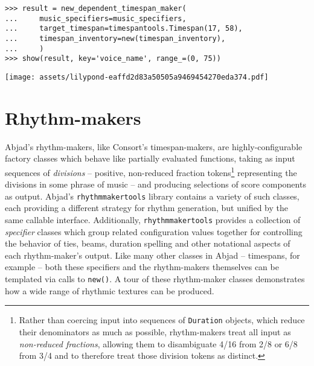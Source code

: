 \begin{comment}
<abjad>
result = new_dependent_timespan_maker(
    music_specifiers=music_specifiers,
    target_timespan=timespantools.Timespan(17, 58),
    timespan_inventory=new(timespan_inventory),
    )
show(result, key='voice_name', range_=(0, 75))
</abjad>
\end{comment}

\begin{abjadbookoutput}
\begin{singlespacing}
\vspace{-0.5\baselineskip}
\begin{lstlisting}
>>> result = new_dependent_timespan_maker(
...     music_specifiers=music_specifiers,
...     target_timespan=timespantools.Timespan(17, 58),
...     timespan_inventory=new(timespan_inventory),
...     )
>>> show(result, key='voice_name', range_=(0, 75))
\end{lstlisting}
\noindent\texttt{[image: assets/lilypond-eaffd2d83a50505a9469454270eda374.pdf]}
\end{singlespacing}
\end{abjadbookoutput}

\section{Rhythm-makers}
\label{sec:rhythm-makers}

Abjad's rhythm-makers, like Consort's timespan-makers, are highly-configurable
factory classes which behave like partially evaluated functions, taking as
input sequences of \emph{divisions} -- positive, non-reduced fraction
tokens\footnote{Rather than coercing input into sequences of \texttt{Duration}
objects, which reduce their denominators as much as possible, rhythm-makers
treat all input as \emph{non-reduced fractions}, allowing them to disambiguate
4/16 from 2/8 or 6/8 from 3/4 and to therefore treat those division tokens as
distinct.} representing the divisions in some phrase of music -- and producing
selections of score components as output. Abjad's \texttt{rhythmmakertools}
library contains a variety of such classes, each providing a different strategy
for rhythm generation, but unified by the same callable interface.
Additionally, \texttt{rhythmmakertools} provides a collection of
\emph{specifier} classes which group related configuration values together for
controlling the behavior of ties, beams, duration spelling and other notational
aspects of each rhythm-maker's output. Like many other classes in Abjad --
timespans, for example -- both these specifiers and the rhythm-makers
themselves can be templated via calls to \texttt{new()}. A tour of these
rhythm-maker classes demonstrates how a wide range of rhythmic textures can be
produced.

